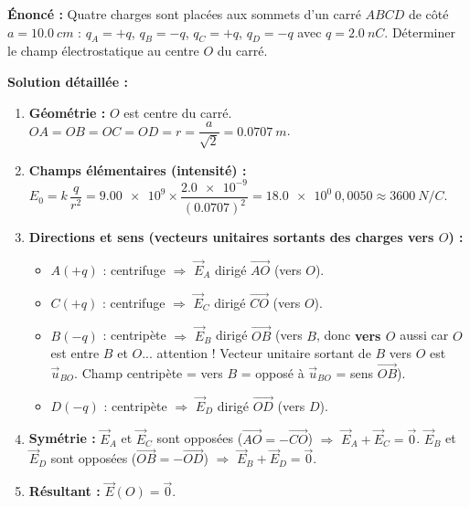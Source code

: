 \documentclass[11pt]{article}
\begin{document}
\begin{exoresolu}
\textbf{Énoncé :} Quatre charges sont placées aux sommets d'un carré $ABCD$ de côté $a = \SI{10,0}{cm}$ : $q_A = +q$, $q_B = -q$, $q_C = +q$, $q_D = -q$ avec $q = \SI{2,0}{nC}$. Déterminer le champ électrostatique au centre $O$ du carré.

\textbf{Solution détaillée :}
\begin{enumerate}
    \item \textbf{Géométrie :} $O$ est centre du carré. $OA = OB = OC = OD = r = \dfrac{a}{\sqrt{2}} = \SI{0,0707}{m}$.
    \item \textbf{Champs élémentaires (intensité) :}
    $E_0 = k\,\dfrac{q}{r^2} = \num{9,00e9} \times \dfrac{\num{2,0e-9}}{(\num{0,0707})^2} = \SI{18,0e0}{0,0050} \approx \SI{3600}{N/C}$.
    \item \textbf{Directions et sens (vecteurs unitaires sortants des charges vers $O$) :}
    \begin{itemize}
        \item $A(+q)$ : centrifuge $\Rightarrow$ $\vec{E}_A$ dirigé $\overrightarrow{AO}$ (vers $O$).
        \item $C(+q)$ : centrifuge $\Rightarrow$ $\vec{E}_C$ dirigé $\overrightarrow{CO}$ (vers $O$).
        \item $B(-q)$ : centripète $\Rightarrow$ $\vec{E}_B$ dirigé $\overrightarrow{OB}$ (vers $B$, donc \textbf{vers $O$} aussi car $O$ est entre $B$ et $O$... attention ! Vecteur unitaire sortant de $B$ vers $O$ est $\vec{u}_{BO}$. Champ centripète = vers $B$ = opposé à $\vec{u}_{BO}$ = sens $\overrightarrow{OB}$).
        \item $D(-q)$ : centripète $\Rightarrow$ $\vec{E}_D$ dirigé $\overrightarrow{OD}$ (vers $D$).
    \end{itemize}
    \item \textbf{Symétrie :}
    $\vec{E}_A$ et $\vec{E}_C$ sont opposées ($\overrightarrow{AO} = -\overrightarrow{CO}$) $\Rightarrow$ $\vec{E}_A + \vec{E}_C = \vec{0}$.
    $\vec{E}_B$ et $\vec{E}_D$ sont opposées ($\overrightarrow{OB} = -\overrightarrow{OD}$) $\Rightarrow$ $\vec{E}_B + \vec{E}_D = \vec{0}$.
    \item \textbf{Résultant :} $\vec{E}(O) = \vec{0}$.
\end{enumerate}
\end{exoresolu}
\end{document}
